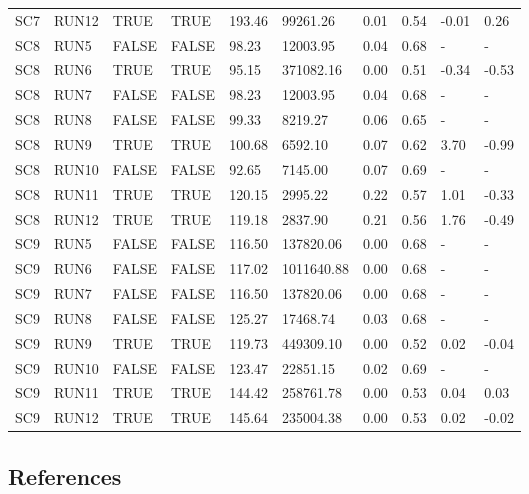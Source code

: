 \documentclass[
  12pt,
]{article}
\begin{document}
\begin{landscape}
\begin{longtable}[t]{llllllllll}
SC7 & RUN12 & TRUE & TRUE & 193.46 & 99261.26 & 0.01 & 0.54 & -0.01 & 0.26\\
SC8 & RUN5 & FALSE & FALSE & 98.23 & 12003.95 & 0.04 & 0.68 & - & -\\
\addlinespace
SC8 & RUN6 & TRUE & TRUE & 95.15 & 371082.16 & 0.00 & 0.51 & -0.34 & -0.53\\
SC8 & RUN7 & FALSE & FALSE & 98.23 & 12003.95 & 0.04 & 0.68 & - & -\\
SC8 & RUN8 & FALSE & FALSE & 99.33 & 8219.27 & 0.06 & 0.65 & - & -\\
SC8 & RUN9 & TRUE & TRUE & 100.68 & 6592.10 & 0.07 & 0.62 & 3.70 & -0.99\\
SC8 & RUN10 & FALSE & FALSE & 92.65 & 7145.00 & 0.07 & 0.69 & - & -\\
\addlinespace
SC8 & RUN11 & TRUE & TRUE & 120.15 & 2995.22 & 0.22 & 0.57 & 1.01 & -0.33\\
SC8 & RUN12 & TRUE & TRUE & 119.18 & 2837.90 & 0.21 & 0.56 & 1.76 & -0.49\\
SC9 & RUN5 & FALSE & FALSE & 116.50 & 137820.06 & 0.00 & 0.68 & - & -\\
SC9 & RUN6 & FALSE & FALSE & 117.02 & 1011640.88 & 0.00 & 0.68 & - & -\\
SC9 & RUN7 & FALSE & FALSE & 116.50 & 137820.06 & 0.00 & 0.68 & - & -\\
\addlinespace
SC9 & RUN8 & FALSE & FALSE & 125.27 & 17468.74 & 0.03 & 0.68 & - & -\\
SC9 & RUN9 & TRUE & TRUE & 119.73 & 449309.10 & 0.00 & 0.52 & 0.02 & -0.04\\
SC9 & RUN10 & FALSE & FALSE & 123.47 & 22851.15 & 0.02 & 0.69 & - & -\\
SC9 & RUN11 & TRUE & TRUE & 144.42 & 258761.78 & 0.00 & 0.53 & 0.04 & 0.03\\
SC9 & RUN12 & TRUE & TRUE & 145.64 & 235004.38 & 0.00 & 0.53 & 0.02 & -0.02\\*
\end{longtable}
\endgroup{}

\end{landscape}

\newpage

\subsection*{References}\label{references}
\end{document}
